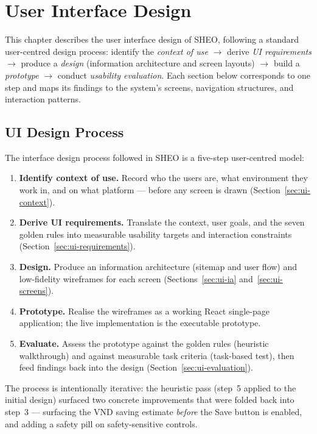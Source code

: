 \chapter{User Interface Design}

This chapter describes the user interface design of SHEO, following a standard
user-centred design process: identify the \emph{context of use} $\rightarrow$ derive
\emph{UI requirements} $\rightarrow$ produce a \emph{design} (information architecture
and screen layouts) $\rightarrow$ build a \emph{prototype} $\rightarrow$ conduct
\emph{usability evaluation}. Each section below corresponds to one step and maps its
findings to the system's screens, navigation structures, and interaction patterns.

\section{UI Design Process}
\label{sec:ui-process}

The interface design process followed in SHEO is a five-step user-centred model:

\begin{enumerate}
  \item \textbf{Identify context of use.}  Record who the users are, what environment
        they work in, and on what platform — before any screen is drawn (Section~\ref{sec:ui-context}).
  \item \textbf{Derive UI requirements.}  Translate the context, user goals, and the
        seven golden rules into measurable usability targets and interaction constraints
        (Section~\ref{sec:ui-requirements}).
  \item \textbf{Design.}  Produce an information architecture (sitemap and user flow)
        and low-fidelity wireframes for each screen
        (Sections~\ref{sec:ui-ia} and~\ref{sec:ui-screens}).
  \item \textbf{Prototype.}  Realise the wireframes as a working React single-page
        application; the live implementation is the executable prototype.
  \item \textbf{Evaluate.}  Assess the prototype against the golden rules (heuristic
        walkthrough) and against measurable task criteria (task-based test), then feed
        findings back into the design (Section~\ref{sec:ui-evaluation}).
\end{enumerate}

The process is intentionally iterative: the heuristic pass (step~5 applied to the
initial design) surfaced two concrete improvements that were folded back into
step~3 — surfacing the VND saving estimate \emph{before} the Save button is enabled,
and adding a safety pill on safety-sensitive controls.


